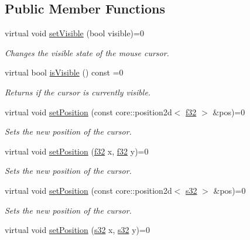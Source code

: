 \subsection*{Public Member Functions}
\begin{DoxyCompactItemize}
\item 
virtual void \hyperlink{classirr_1_1gui_1_1ICursorControl_aceb41d68494e2b2076fbc6949b254c74}{set\+Visible} (bool visible)=0
\begin{DoxyCompactList}\small\item\em Changes the visible state of the mouse cursor. \end{DoxyCompactList}\item 
virtual bool \hyperlink{classirr_1_1gui_1_1ICursorControl_ae1d1ca4c1c3042388881fabda4e53a42}{is\+Visible} () const =0
\begin{DoxyCompactList}\small\item\em Returns if the cursor is currently visible. \end{DoxyCompactList}\item 
virtual void \hyperlink{classirr_1_1gui_1_1ICursorControl_a951b5afe97fa21d98ce5360d96314306}{set\+Position} (const core\+::position2d$<$ \hyperlink{namespaceirr_a0277be98d67dc26ff93b1a6a1d086b07}{f32} $>$ \&pos)=0
\begin{DoxyCompactList}\small\item\em Sets the new position of the cursor. \end{DoxyCompactList}\item 
virtual void \hyperlink{classirr_1_1gui_1_1ICursorControl_adca41054684f73435c9b045520f7c83b}{set\+Position} (\hyperlink{namespaceirr_a0277be98d67dc26ff93b1a6a1d086b07}{f32} x, \hyperlink{namespaceirr_a0277be98d67dc26ff93b1a6a1d086b07}{f32} y)=0
\begin{DoxyCompactList}\small\item\em Sets the new position of the cursor. \end{DoxyCompactList}\item 
virtual void \hyperlink{classirr_1_1gui_1_1ICursorControl_a421c770ffc494f8f6082a16bef0feed2}{set\+Position} (const core\+::position2d$<$ \hyperlink{namespaceirr_ac66849b7a6ed16e30ebede579f9b47c6}{s32} $>$ \&pos)=0
\begin{DoxyCompactList}\small\item\em Sets the new position of the cursor. \end{DoxyCompactList}\item 
virtual void \hyperlink{classirr_1_1gui_1_1ICursorControl_a3b0a59608d1d0810079349acfa01a79b}{set\+Position} (\hyperlink{namespaceirr_ac66849b7a6ed16e30ebede579f9b47c6}{s32} x, \hyperlink{namespaceirr_ac66849b7a6ed16e30ebede579f9b47c6}{s32} y)=0

\end{DoxyCompactItemize}
